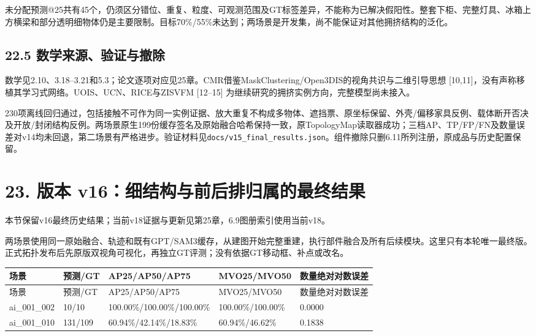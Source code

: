 \documentclass[UTF8,fontset=fandol]{ctexart}
\begin{document}
未分配预测@25共有45个，仍须区分错位、重复、粒度、可观测范围及GT标签差异，不能称为已解决假阳性。整套下柜、完整灯具、冰箱上方横梁和部分透明细物体仍是主要限制。目标70\%/55\%未达到；两场景是开发集，尚不能保证对其他拥挤结构的泛化。



\subsection*{22.5 数学来源、验证与撤除}

数学见2.10、3.18–3.21和5.3；论文逐项对应见25章。CMR借鉴MaskClustering/Open3DIS的视角共识与二维引导思想 [10,11]，没有声称移植其学习式网络。UOIS、UCN、RICE与ZISVFM [12–15] 为继续研究的拥挤实例方向，完整模型尚未接入。



230项离线回归通过，包括接触不可作为同一实例证据、放大重复不构成多物体、遮挡票、原坐标保留、外壳/偏移家具反例、载体断开否决及开放/封闭结构反例。两场景原生199份缓存签名及原始融合哈希保持一致，原TopologyMap读取器成功；三档AP、TP/FP/FN及数量误差对v14均未回退，第二场景有严格进步。验证材料见\texttt{docs/\allowbreak{}v15\_\allowbreak{}final\_\allowbreak{}results.\allowbreak{}json}。组件撤除只删6.11所列注册，原成品与历史配置保留。



\section*{23. 版本 v16：细结构与前后排归属的最终结果}

本节保留v16最终历史结果；当前v18证据与更新见第25章，6.9图册索引使用当前v18。



两场景使用同一原始融合、轨迹和既有GPT/SAM3缓存，从建图开始完整重建，执行部件融合及所有后续模块。这里只有本轮唯一最终版。正式拓扑发布后先原版双视角可视化，再独立GT评测；没有依据GT移动框、补点或改名。



{\small
\begin{longtable}{|p{}|p{}|p{}|p{}|p{}|}
\hline
场景 & 预测/GT & AP25/AP50/AP75 & MVO25/MVO50 & 数量绝对对数误差 \\ \hline
\endfirsthead
\hline
场景 & 预测/GT & AP25/AP50/AP75 & MVO25/MVO50 & 数量绝对对数误差 \\ \hline
\endhead
ai\_001\_002 & 10/10 & 100.00\%/100.00\%/100.00\% & 100.00\%/100.00\% & 0.0000 \\ \hline
ai\_001\_010 & 131/109 & 60.94\%/42.14\%/18.83\% & 60.94\%/46.62\% & 0.1838 \\ \hline
\end{longtable}
}
\end{document}
